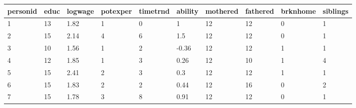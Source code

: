 \documentclass{article}
\begin{document}
\begin{table}[h!]
\begin{tabular}{|l|lllllllll|}
\hline
personid & \multicolumn{1}{l|}{educ} & \multicolumn{1}{l|}{logwage} & \multicolumn{1}{l|}{potexper} & \multicolumn{1}{l|}{timetrnd} & \multicolumn{1}{l|}{ability} & \multicolumn{1}{l|}{mothered} & \multicolumn{1}{l|}{fathered} & \multicolumn{1}{l|}{brknhome} & siblings \\ \hline
1        & 13                        & 1.82                         & 1                             & 0                             & 1                            & 12                            & 12                            & 0                             & 1        \\ \cline{1-1}
2        & 15                        & 2.14                         & 4                             & 6                             & 1.5                          & 12                            & 12                            & 0                             & 1        \\ \cline{1-1}
3        & 10                        & 1.56                         & 1                             & 2                             & -0.36                        & 12                            & 12                            & 1                             & 1        \\ \cline{1-1}
4        & 12                        & 1.85                         & 1                             & 3                             & 0.26                         & 12                            & 10                            & 1                             & 4        \\ \cline{1-1}
5        & 15                        & 2.41                         & 2                             & 3                             & 0.3                          & 12                            & 12                            & 1                             & 1        \\ \cline{1-1}
6        & 15                        & 1.83                         & 2                             & 2                             & 0.44                         & 12                            & 16                            & 0                             & 2        \\ \cline{1-1}
7        & 15                        & 1.78                         & 3                             & 8                             & 0.91                         & 12                            & 12                            & 0                             & 1        \\ \cline{1-1}

\end{tabular}
\end{table}
\end{document}
